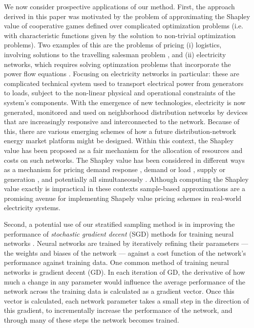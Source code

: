 \documentclass[]{interact}
\theoremstyle{plain}%
\theoremstyle{definition}
\theoremstyle{remark}
\begin{document}
We now consider prospective applications of our method. 
First, the approach derived in this paper was motivated by the problem of approximating the Shapley value of cooperative games defined over complicated optimization problems (i.e. with characteristic functions given by the solution to non-trivial optimization problems). 
Two examples of this are the problems of pricing (i) logistics, involving solutions to the travelling salesman problem \citep{AzizEtal2016}, and 
(ii) electricity networks, which requires solving optimzation problems that incorporate the power flow equations \citep{DBLP:journals/tsg/OBrienGR15,archie_paper1,ACUNA2018161,burgess_abstract}.
Focusing on electricity networks in particular: 
these are complicated technical system used to transport electrical power from generators to loads, 
subject to the non-linear physical and operational constraints of the system's components.
With the emergence of new technologies, electricity is now generated, monitored and used on neighborhood distribution networks by devices that are increasingly responsive and interconnected to the network. 
Because of this, there are various emerging schemes of how a future distribution-network energy market platform might be designed.
Within this context, the Shapley value has been proposed as a fair mechanism for the allocation of resources and costs on such networks.
The Shapley value has been considered in different ways as a mechanism for pricing demand response \citep{DBLP:journals/tsg/OBrienGR15}, demand or load \citep{archie_paper1}, supply or generation \citep{ACUNA2018161}, and potentially all simultaneously \citep{burgess_abstract}.
Although computing the Shapley value exactly is impractical in these contexts 
sample-based approximations are a promising avenue for implementing Shapely value pricing schemes in real-world electricity systems.

Second, a potential use of our stratified sampling method is in improving the performance of \textit{stochastic gradient decent} (SGD) methods for training neural networks \citep{2016arXiv160904747R}.
Neural networks are trained by iteratively refining their parameters --- the weights and biases of the network --- against a cost function of the network's performance against training data.
One common method of training neural networks is gradient decent (GD).
In each iteration of GD, the derivative of how much a change in any parameter would influence the average performance of the network across the training data is calculated as a gradient vector.
Once this vector is calculated, each network parameter takes a small step in the direction of this gradient, to incrementally increase the performance of the network, 
and through many of these steps the network becomes trained.
\end{document}
